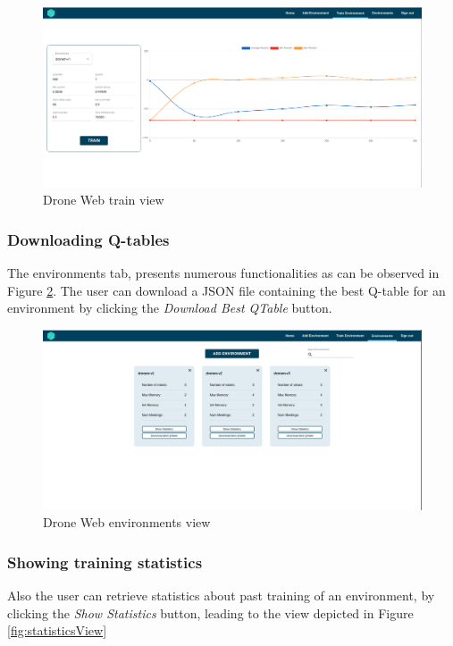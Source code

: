 \begin{figure}[!htb]
    \centering
    \includegraphics[scale=0.22]{Figures/trainView.png}
    \caption{Drone Web train view}
    \label{fig:trainView}
\end{figure}


\subsubsection{Downloading Q-tables}
The environments tab, presents numerous functionalities as can be observed in Figure \ref{fig:ensvView}. The user can download a JSON file containing the best Q-table for an environment by clicking the \emph{Download Best QTable} button. 

\begin{figure}[!htb]
    \centering
    \includegraphics[scale=0.22]{Figures/environmentsView.png}
    \caption{Drone Web environments view}
    \label{fig:ensvView}
\end{figure}

\subsubsection{Showing training statistics}
Also the user can retrieve statistics about past training of an environment, by clicking the \emph{Show Statistics} button, leading to the view depicted in Figure \ref{fig:statisticsView}


